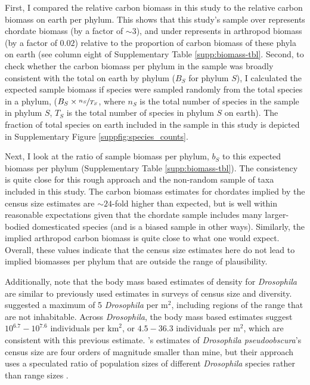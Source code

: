 \documentclass[11pt]{article}
\begin{document}
First, I compared the relative carbon biomass in this study to the relative
carbon biomass on earth per phylum. This shows that this study's sample over
represents chordate biomass (by a factor of $\mathord{\sim}3$), and under
represents in arthropod biomass (by a factor of $0.02$) relative to the
proportion of carbon biomass of these phyla on earth (see column eight of
Supplementary Table \ref{supp:biomass-tbl}. Second, to check whether the carbon
biomass per phylum in the sample was broadly consistent with the total on earth
by phylum ($B_S$ for phylum $S$), I calculated the expected sample biomass if
species were sampled randomly from the total species in a phylum, ($B_S \times
\nicefrac{n_S}{T_S}$, where $n_S$ is the total number of species in the sample
in phylum $S$, $T_S$ is the total number of species in phylum $S$ on earth).
The fraction of total species on earth included in the sample in this study is
depicted in Supplementary Figure \ref{suppfig:species_counts}.  

Next, I look at the ratio of sample biomass per phylum, $b_S$ to this expected
biomass per phylum (Supplementary Table \ref{supp:biomass-tbl}). The
consistency is quite close for this rough approach and the non-random sample of
taxa included in this study. The carbon biomass estimates for chordates implied
by the census size estimates are $\mathord{\sim}24$-fold higher than expected, but is
well within reasonable expectations given that the chordate sample includes
many larger-bodied domesticated species (and is a biased sample in other ways).
Similarly, the implied arthropod carbon biomass is quite close to what one
would expect. Overall, these values indicate that the census size estimates
here do not lead to implied biomasses per phylum that are outside the range of
plausibility.

Additionally, note that the body mass based estimates of density for
\emph{Drosophila} are similar to previously used estimates in surveys of census
size and diversity. \textcite{Nei1984-zi} suggested a maximum of 5
\emph{Drosophila} per $\text{m}^2$, including regions of the range that are not
inhabitable. Across \emph{Drosophila}, the body mass based estimates suggest
$10^{6.7}-10^{7.6}$ individuals per $\text{km}^2$, or $4.5-36.3$ individuals
per $\text{m}^2$, which are consistent with this previous estimate.
\citeauthor{Nei1984-zi}'s estimates of \emph{Drosophila pseudoobscura}'s census
size are four orders of magnitude smaller than mine, but their approach uses a
speculated ratio of population sizes of different \emph{Drosophila} species
rather than range sizes \parencite[p. 81]{Nei1984-zi}.
\end{document}
